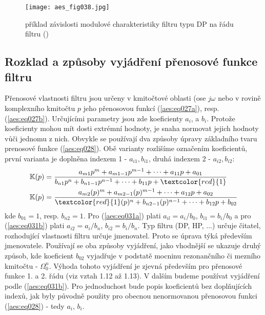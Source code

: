       \begin{figure}[ht!]  %
        \centering
        \texttt{[image: aes\_fig038.jpg]}
        \caption{příklad závislosti modulové charakteristiky filtru typu DP na řádu filtru
                (\cite[s.~37]{HajekSedlacek2002})}
        \label{aes:fig038}    
      \end{figure}

    \subsection{Rozklad a způsoby vyjádření přenosové funkce filtru}
      Přenosové vlastnosti filtru jsou určeny v kmitočtové oblasti (ose \(j\omega\) nebo v rovině
      komplexního kmitočtu \(p\) jeho přenosovou funkcí (\ref{aes:eq027a}), resp.
      (\ref{aes:eq027b}). Určujícími parametry jsou zde koeficienty \(a_i\), a \(b_i\). Protože
      koeficienty mohou mít dosti extrémní hodnoty, je snaha normovat jejich hodnoty vůči jednomu z
      nich. Obvykle se používají dva způsoby úpravy základního tvaru prenosové funkce
      (\ref{aes:eq028}). Obě varianty rozlišíme označením koeficientů, první varianta je doplněna
      indexem 1 - \(a_{i1}, b_{i1}\), druhá indexem 2 - \(a_{i2}, b_{i2}\): 
      \begin{subequations}
        \begin{align}
          \mathbb{K}(p) 
            &= \frac{a_{m1}p^m + a_{m1-1}p^{m-1} + \cdots + a_{11}p +a_{01}}
                    {b_{n1}p^n + b_{n1-1}p^{n-1} + \cdots + b_{11}p +\textcolor{red}{1}}  
                    \label{aes:eq031a}                                                        \\
          \mathbb{K}(p) 
            &= \frac{a_{m2}(p)^m + a_{m2-1}(p)^{m-1} + \cdots + a_{12}p +a_{02}}
                    {\textcolor{red}{1}(p)^n + b_{n2-1}(p)^{n-1} + \cdots + b_{12}p +b_{02}} 
                    \label{aes:eq031b}
        \end{align}
      \end{subequations} 
      kde \(b_{01} = 1\), resp. \(b_{n2} = 1\). Pro (\ref{aes:eq031a}) plati \(a_{il} = a_i/b_0\),
      \(b_{i1} = b_i/b_0\) a pro (\ref{aes:eq031b}) plati \(a_{i2} = a_i/b_n\), \(b_{i2} =
      b_i/b_n\). Typ filtru (DP, HP, ...) určuje čitatel, rozhodující vlastnosti filtru určuje
      jmenovatel. Proto se úprava týká především jmenovatele. Používají se oba způsoby vyjádření,
      jako vhodnější se ukazuje druhý způsob, kde koeficient \(b_{02}\) vyjadřuje v podstatě mocninu
      rezonančního či mezního kmitočtu - \(\Omega_0^n\). Výhoda tohoto vyjádření je zjevná především
      pro přenosové funkce 1. a 2. řádu (viz vztah 1.12 až 1.13). V dalším budeme používat vyjádření
      podle (\ref{aes:eq031b}). Pro jednoduchost bude popis koeficientů bez doplňujících indexů, jak
      byly původně použity pro obecnou nenormovanou přenosovou funkci (\ref{aes:eq028}) - tedy
      \(a_i\), \(b_i\). 


